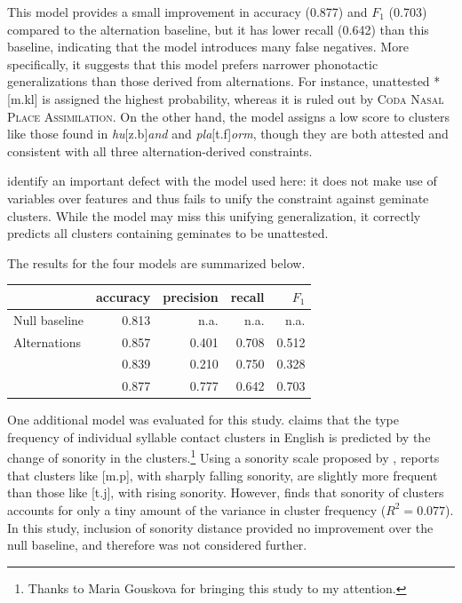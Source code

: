 This model provides a small improvement in accuracy (0.877) and $F_1$ (0.703) compared to the alternation baseline, but it has lower recall (0.642) than this baseline, indicating that the \citeauthor{Hayes2008a} model introduces many false negatives. 
More specifically, it suggests that this model prefers narrower phonotactic generalizations than those derived from alternations. For instance, unattested *[m.kl] is assigned the highest probability, whereas it is ruled out by \textsc{Coda Nasal Place Assimilation}. On the other hand, the \citeauthor{Hayes2008a} model assigns a low score to clusters like those found in \emph{hu}[z.b]\emph{and} and \emph{pla}[t.f]\emph{orm}, though they are both attested and consistent with all three alternation-derived constraints. 

\citet{Berent2012} identify an important defect with the \citeauthor{Hayes2008a} model used here: it does not make use of variables over features and thus fails to unify the constraint against geminate clusters. While the model may miss this unifying generalization, it correctly predicts all clusters containing geminates to be unattested. 

The results for the four models are summarized below.

\begin{example}
\begin{tabular}{l | r r r r}
\toprule
                          & accuracy & precision & recall & $F_1$ \\ 
\midrule
Null baseline             & 0.813    & n.a.      & n.a.   & n.a.  \\
Alternations              & 0.857    & 0.401     & 0.708  & 0.512 \\
\citet{Pierrehumbert1994} & 0.839    & 0.210     & 0.750  & 0.328 \\
\citet{Hayes2008a}        & 0.877    & 0.777     & 0.642  & 0.703 \\
\bottomrule
\end{tabular}
\end{example}

One additional model was evaluated for this study. \citet{McGowan2011} claims that the type frequency of individual syllable contact clusters in English is predicted by the change of sonority in the clusters.\footnote{Thanks to Maria Gouskova for bringing this study to my attention.} Using a sonority scale proposed by \citet{Jespersen1904}, \citeauthor{McGowan2011} reports that clusters like [m.p], with sharply falling sonority, are slightly more frequent than those like [t.j], with rising sonority. However, \citeauthor{McGowan2011} finds that sonority of clusters accounts for only a tiny amount of the variance in cluster frequency ($R^2 = 0.077$). In this study, inclusion of sonority distance provided no improvement over the null baseline, and therefore was not considered further.

